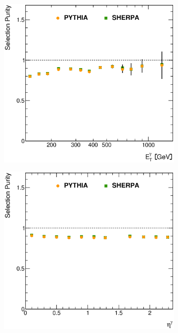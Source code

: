 \documentclass[12pt, twoside]{article}
\numberwithin{equation}{section}
\numberwithin{figure}{section}
\newenvironment{changemargin}[2]{%
\begin{list}{}{%
\setlength{\topsep}{0pt}%
\setlength{\leftmargin}{#1}%
\setlength{\rightmargin}{#2}%
\setlength{\listparindent}{\parindent}%
\setlength{\itemindent}{\parindent}%
\setlength{\parsep}{\parskip}%
}%
\item[]}{\end{list}}
\begin{document}
\begin{figure}
    \centering
    \checkoddpage
    \ifoddpage
        \begin{changemargin}{-1.0cm}{-0.75cm}
    \else
        \begin{changemargin}{-0.75cm}{-1.0cm}
    \fi
        \begin{subfigure}[b]{0.37\textwidth}
            \includegraphics[width=\textwidth]{./images/SelectionPurities/PUR-101.eps}
            \subcaption{}
            \label{fig:SelectionPuritiesEtPhoton}
        \end{subfigure}
        \begin{subfigure}[b]{0.37\textwidth}
            \includegraphics[width=\textwidth]{./images/SelectionPurities/PUR-102.eps}

\end{subfigure}
\end{changemargin}
\end{changemargin}
\end{figure}
\end{document}
